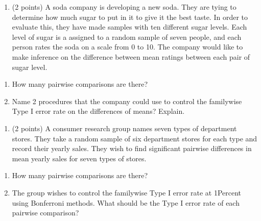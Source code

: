 \documentclass[
]{article}
\providecommand{\tightlist}{%
  \setlength{\itemsep}{0pt}\setlength{\parskip}{0pt}}
\begin{document}
\begin{enumerate}
\def\labelenumi{\arabic{enumi}.}
\setcounter{enumi}{2}
\tightlist
\item
  (2 points) A soda company is developing a new soda. They are tying to
  determine how much sugar to put in it to give it the best taste. In
  order to evaluate this, they have made samples with ten different
  sugar levels. Each level of sugar is a assigned to a random sample of
  seven people, and each person rates the soda on a scale from 0 to 10.
  The company would like to make inference on the difference between
  mean ratings between each pair of sugar level.
\end{enumerate}

\begin{enumerate}
\def\labelenumi{(\alph{enumi})}
\item
  How many pairwise comparisons are there?
\item
  Name 2 procedures that the company could use to control the familywise
  Type I error rate on the differences of means? Explain.
\end{enumerate}

\begin{enumerate}
\def\labelenumi{\arabic{enumi}.}
\setcounter{enumi}{3}
\tightlist
\item
  (2 points) A consumer research group names seven types of department
  stores. They take a random sample of six department stores for each
  type and record their yearly sales. They wish to find significant
  pairwise differences in mean yearly sales for seven types of stores.
\end{enumerate}

\begin{enumerate}
\def\labelenumi{(\alph{enumi})}
\item
  How many pairwise comparisons are there?
\item
  The group wishes to control the familywise Type I error rate at
  1Percent using Bonferroni methods. What should be the Type I error
  rate of each pairwise comparison?
\end{enumerate}
\end{document}
